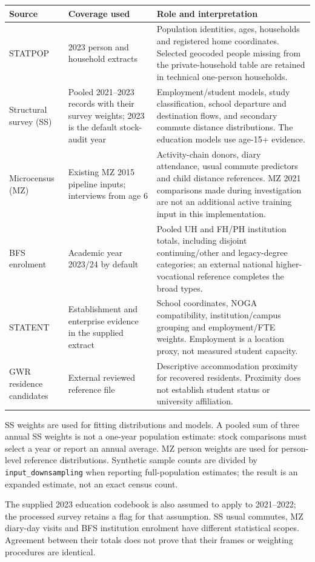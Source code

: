 \documentclass[11pt,a4paper]{article}
\newcommand{\code}[1]{\nolinkurl{#1}}
\begin{document}
\begin{longtable}{L{.22\textwidth}L{.27\textwidth}L{.43\textwidth}}
\toprule Source & Coverage used & Role and interpretation \\
\midrule\endhead
STATPOP & 2023 person and household extracts & Population identities, ages,
households and registered home coordinates. Selected geocoded people missing
from the private-household table are retained in technical one-person households. \\
Structural survey (SS) & Pooled 2021--2023 records with their survey weights;
2023 is the default stock-audit year & Employment/student models, study
classification, school departure and destination flows, and secondary commute
distance distributions. The education models use age-15+ evidence. \\
Microcensus (MZ) & Existing MZ 2015 pipeline inputs; interviews from age 6 &
Activity-chain donors, diary attendance, usual commute predictors and child
distance references. MZ 2021 comparisons made during investigation are not an
additional active training input in this implementation. \\
BFS enrolment & Academic year 2023/24 by default & Pooled UH and FH/PH institution
totals, including disjoint continuing/other and legacy-degree categories;
an external national higher-vocational reference completes the broad types. \\
STATENT & Establishment and enterprise evidence in the supplied extract &
School coordinates, NOGA compatibility, institution/campus grouping and
employment/FTE weights. Employment is a location proxy, not measured student capacity. \\
GWR residence candidates & External reviewed reference file & Descriptive
accommodation proximity for recovered residents. Proximity does not establish
student status or university affiliation. \\
\bottomrule
\end{longtable}

SS weights are used for fitting distributions and models. A pooled sum of three
annual SS weights is not a one-year population estimate: stock comparisons
must select a year or report an annual average. MZ person weights are used for
person-level reference distributions. Synthetic sample counts are divided by
\code{input_downsampling} when reporting full-population estimates; the result
is an expanded estimate, not an exact census count.

The supplied 2023 education codebook is also assumed to apply to 2021--2022;
the processed survey retains a flag for that assumption. SS usual commutes,
MZ diary-day visits and BFS institution enrolment have different statistical
scopes. Agreement between their totals does not prove that their frames or
weighting procedures are identical.
\end{document}
